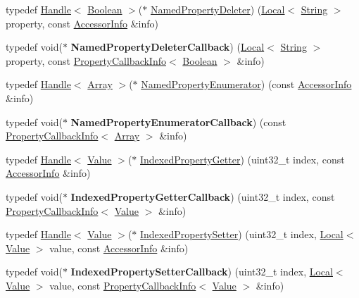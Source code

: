 \begin{DoxyCompactItemize}
\item 
typedef \hyperlink{classv8_1_1_handle}{Handle}$<$ \hyperlink{classv8_1_1_boolean}{Boolean} $>$($\ast$ \hyperlink{namespacev8_a7899471fae82b252750b81f41d5c1e26}{Named\+Property\+Deleter}) (\hyperlink{classv8_1_1_local}{Local}$<$ \hyperlink{classv8_1_1_string}{String} $>$ property, const \hyperlink{classv8_1_1_accessor_info}{Accessor\+Info} \&info)
\item 
\hypertarget{namespacev8_aaba861076c5b111912cfa0791d348437}{}typedef void($\ast$ {\bfseries Named\+Property\+Deleter\+Callback}) (\hyperlink{classv8_1_1_local}{Local}$<$ \hyperlink{classv8_1_1_string}{String} $>$ property, const \hyperlink{classv8_1_1_property_callback_info}{Property\+Callback\+Info}$<$ \hyperlink{classv8_1_1_boolean}{Boolean} $>$ \&info)\label{namespacev8_aaba861076c5b111912cfa0791d348437}

\item 
typedef \hyperlink{classv8_1_1_handle}{Handle}$<$ \hyperlink{classv8_1_1_array}{Array} $>$($\ast$ \hyperlink{namespacev8_acbd04b83708cb5a80e73e0396f176e58}{Named\+Property\+Enumerator}) (const \hyperlink{classv8_1_1_accessor_info}{Accessor\+Info} \&info)
\item 
\hypertarget{namespacev8_a5f6f16818a9cddacadbfe6d90ca3a6b1}{}typedef void($\ast$ {\bfseries Named\+Property\+Enumerator\+Callback}) (const \hyperlink{classv8_1_1_property_callback_info}{Property\+Callback\+Info}$<$ \hyperlink{classv8_1_1_array}{Array} $>$ \&info)\label{namespacev8_a5f6f16818a9cddacadbfe6d90ca3a6b1}

\item 
typedef \hyperlink{classv8_1_1_handle}{Handle}$<$ \hyperlink{classv8_1_1_value}{Value} $>$($\ast$ \hyperlink{namespacev8_abf3be19b5157493da3859987cc50c6ab}{Indexed\+Property\+Getter}) (uint32\+\_\+t index, const \hyperlink{classv8_1_1_accessor_info}{Accessor\+Info} \&info)
\item 
\hypertarget{namespacev8_a48e7816ba64447bf32a25d194588daaf}{}typedef void($\ast$ {\bfseries Indexed\+Property\+Getter\+Callback}) (uint32\+\_\+t index, const \hyperlink{classv8_1_1_property_callback_info}{Property\+Callback\+Info}$<$ \hyperlink{classv8_1_1_value}{Value} $>$ \&info)\label{namespacev8_a48e7816ba64447bf32a25d194588daaf}

\item 
typedef \hyperlink{classv8_1_1_handle}{Handle}$<$ \hyperlink{classv8_1_1_value}{Value} $>$($\ast$ \hyperlink{namespacev8_a3ca53e294b9b695b3777af904ca942b6}{Indexed\+Property\+Setter}) (uint32\+\_\+t index, \hyperlink{classv8_1_1_local}{Local}$<$ \hyperlink{classv8_1_1_value}{Value} $>$ value, const \hyperlink{classv8_1_1_accessor_info}{Accessor\+Info} \&info)
\item 
\hypertarget{namespacev8_a4ac7cc6185ebc8b6a199f9fa8e6bf5c3}{}typedef void($\ast$ {\bfseries Indexed\+Property\+Setter\+Callback}) (uint32\+\_\+t index, \hyperlink{classv8_1_1_local}{Local}$<$ \hyperlink{classv8_1_1_value}{Value} $>$ value, const \hyperlink{classv8_1_1_property_callback_info}{Property\+Callback\+Info}$<$ \hyperlink{classv8_1_1_value}{Value} $>$ \&info)\label{namespacev8_a4ac7cc6185ebc8b6a199f9fa8e6bf5c3}


\end{DoxyCompactItemize}
